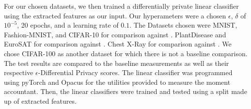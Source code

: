 \documentclass{article}
\theoremstyle{definition}
\begin{document}
For our chosen datasets, we then trained a differentially private linear classifier using the extracted features as our input. Our hyperameters were a chosen $\epsilon$, $\delta$ of $10^{-5}$, 20 epochs, and a learning rate of $0.1$. The Datasets chosen were MNIST, Fashion-MNIST, and CIFAR-10 for comparison against \cite{tramer2020differentially}. PlantDisease and EuroSAT for comparison against \cite{luo2021scalable}. Chest X-Ray for comparison against \cite{ziller2021medical}. We chose CIFAR-100 as another dataset for which there is not a baseline comparison. The test results are compared to the baseline measurements as well as their respective $\epsilon$-Differential Privacy scores. The linear classifier was programmed using pyTorch and Opacus for the utilities provided to measure the moment accountant. Then, the linear classifiers were trained and tested using a split made up of extracted features.
\end{document}
